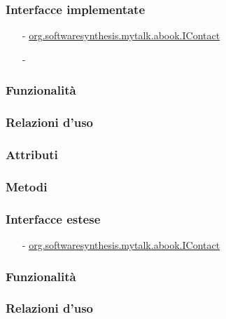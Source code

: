 
\subsubsection*{Interfacce implementate}
\begin{itemize}[noitemsep,nolistsep]
  \item[-] \hyperref[IContact]{\ttfamily{}org.softwaresynthesis.mytalk.abook.IContact}
  \item[-] 
\end{itemize}

\subsubsection*{Funzionalità}

\subsubsection*{Relazioni d'uso}

\subsubsection*{Attributi}

\subsubsection*{Metodi}

\subsubsection*{Interfacce estese}
\begin{itemize}[noitemsep,nolistsep]
  \item[-] \hyperref[IContact]{\ttfamily{}org.softwaresynthesis.mytalk.abook.IContact}
\end{itemize}

\subsubsection*{Funzionalità}

\subsubsection*{Relazioni d'uso}

